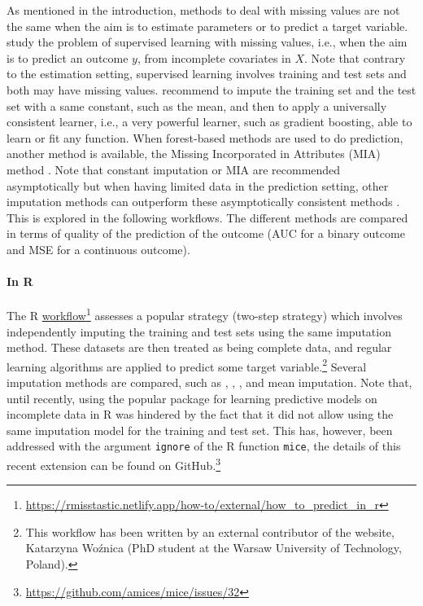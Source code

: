 As mentioned in the introduction, methods to deal with missing values are not the same when the aim is to estimate parameters or to predict a target variable. \citet{josse_etal_2019} study the problem of supervised learning with missing values, i.e., when the aim is to predict an outcome $y$, from incomplete covariates in $X$. Note that contrary to the estimation setting, supervised learning involves training and test sets and both may have missing values. \citet{josse_etal_2019} recommend to impute the training set and the test set with a same constant, such as the mean, and then to apply a universally consistent learner, i.e., a very powerful learner, such as gradient boosting,  able to learn or fit any function. When  forest-based methods are used to do prediction, another method is available, the Missing Incorporated in Attributes (MIA) method \citep{twala2008good}. Note that constant imputation or MIA are recommended asymptotically but when having limited data in the prediction setting, other imputation methods can outperform these asymptotically consistent methods \citep{josse_etal_2019}. This is explored in the following workflows. The different methods are compared in terms of quality of the prediction of the outcome (AUC for a binary outcome and MSE for a continuous outcome). 



\paragraph*{In {R}} The {R} \href{https://rmisstastic.netlify.app/how-to/external/how_to_predict_in_r}{workflow}\footnote{\url{https://rmisstastic.netlify.app/how-to/external/how_to_predict_in_r}} assesses a popular strategy (two-step strategy) which involves independently imputing the training and test sets using the same imputation method. These datasets are then treated as being complete data, and regular learning algorithms are applied to predict some target variable.\footnote{This workflow has been written by an external contributor of the website, Katarzyna Woźnica (PhD student at the Warsaw University of Technology, Poland).} Several imputation methods are compared, such as , , , and mean imputation. 
Note that, until recently, using the popular  package for learning predictive models on incomplete data in {R} was hindered by the fact that it did not allow using the same imputation model for the training and test set. This has, however, been addressed with the argument \texttt{ignore} of the {R} function \texttt{mice}, the details of this recent extension can be found on GitHub.\footnote{\url{https://github.com/amices/mice/issues/32}}

